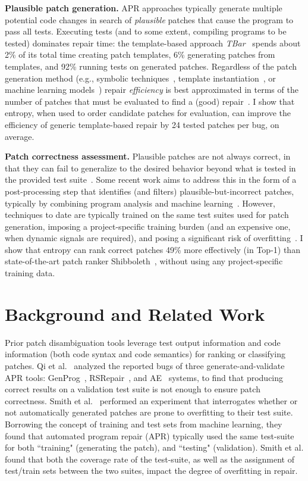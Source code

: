 \documentclass[12pt,openany,oneside,table]{cmuthesis}
\begin{document}
\noindent\textbf{Plausible patch generation.} APR approaches
typically generate multiple potential code changes in search of 
\emph{plausible} patches that cause the program to pass all tests.
Executing tests (and to some extent, compiling programs to be tested) dominates
repair time: the template-based approach \textit{TBar}~\cite{TBar} spends about 2\% of
its total time creating patch templates, 6\% generating patches from templates,
and 92\% running tests on generated patches. Regardless of the patch generation method (e.g.,
symbolic techniques~\cite{patch-sim, claire_apr,angelix}, template instantiation~\cite{TBar, kim2022multi}, or
machine learning models~\cite{xia2023automated}) repair \emph{efficiency} is best
approximated in terms of the number of patches that must be evaluated to find a
(good) repair~\cite{efficiency}.
I show that entropy, when used to order candidate patches for evaluation, can
improve the efficiency of generic template-based repair by 24
tested patches per bug, on average.

\vspace{1ex} 
\noindent\textbf{Patch correctness assessment.}
Plausible patches are not always correct, in that they can fail to generalize to
the desired behavior beyond what is tested in the provided test 
suite~\cite{CURE}.  Some recent work aims to address this in the form of a 
post-processing step that identifies (and filters) plausible-but-incorrect
patches, typically by combining program analysis and machine
learning~\cite{Panther, Shibboleth, yang2023large}.  However, techniques to date
are typically trained on the same test suites used for patch generation,
imposing a project-specific training burden (and an expensive one, when dynamic
signals are required), and posing a significant risk of overfitting~\cite{CURE, yang2023large}.  
I show that entropy can rank correct patches 49\% more effectively (in Top-1) than state-of-the-art patch ranker Shibboleth~\cite{Shibboleth}, without using any project-specific training data.

\section{Background and Related Work}

Prior patch disambiguation tools leverage test output information and code information (both code syntax and code semantics) for ranking or classifying patches. Qi et al.~\cite{qi2015analysis} analyzed the reported bugs of three generate-and-validate APR tools: GenProg~\cite{genprog}, RSRepair~\cite{rsrepair}, and AE~\cite{ae} systems, to find that producing correct results on a validation test suite is not enough to ensure patch correctness. Smith et al.~\cite{CURE} performed an experiment that interrogates whether or not automatically generated patches are prone to overfitting to their test suite. Borrowing the concept of training and test sets from machine learning, they found that automated program repair (APR) typically used the same test-suite for both ``training" (generating the patch), and ``testing" (validation). Smith et al. found that both the coverage rate of the test-suite, as well as the assignment of test/train sets between the two suites, impact the degree of overfitting in repair.
\end{document}
